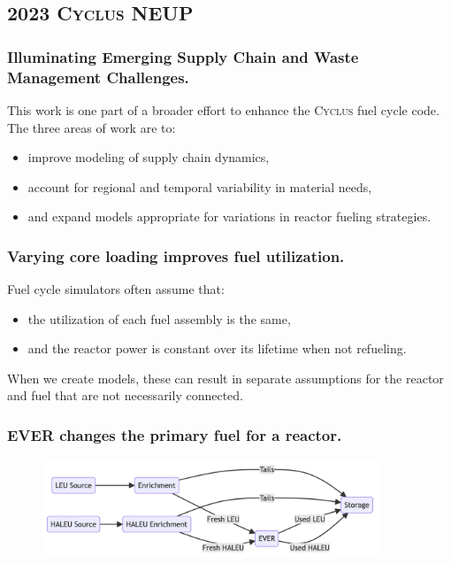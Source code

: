 \documentclass[9pt]{beamer}
\newcommand{\cyclus}{\textsc{Cyclus}\xspace}
\begin{document}
\subsection{2023 \cyclus NEUP}
\begin{frame}
  \frametitle{Illuminating Emerging Supply Chain and Waste Management
  Challenges.}
  This work is one part of a broader effort to enhance the \cyclus fuel cycle code. The three areas of work are to:
  \begin{itemize}
    \item improve modeling of supply chain dynamics,
    \item account for regional and temporal variability in material needs,
    \item and expand models appropriate for variations in reactor fueling strategies.
  \end{itemize}
\end{frame}

\begin{frame}
  \frametitle{Varying core loading improves fuel utilization.}
  Fuel cycle simulators often \cite{out_of_core} assume that:
  \begin{itemize}
    \item the utilization of each fuel assembly is the same,
    \item and the reactor power is constant over its lifetime when not refueling.
  \end{itemize}
  When we create models, these can result in separate assumptions for the reactor and fuel that are not necessarily connected.
\end{frame}

\begin{frame}
  \frametitle{EVER changes the primary fuel for a reactor.}
  \begin{figure}
    \centering
    \includegraphics[width=0.90\textwidth]{images/ever_diagram.png}
  \end{figure}
\end{frame}

\end{document}
